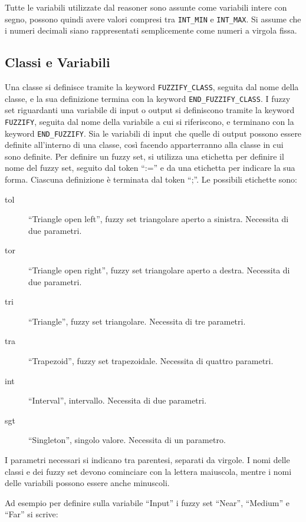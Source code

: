 Tutte le variabili utilizzate dal reasoner sono assunte come variabili intere con segno, possono quindi avere valori compresi tra \verb|INT_MIN| e \verb|INT_MAX|.
Si assume che i numeri decimali siano rappresentati semplicemente come numeri a virgola fissa.


\subsection{Classi e Variabili}
Una classe si definisce tramite la keyword \verb|FUZZIFY_CLASS|, seguita dal nome della classe, e la sua definizione termina con la keyword \verb|END_FUZZIFY_CLASS|.
I fuzzy set riguardanti una variabile di input o output si definiscono tramite la keyword \verb|FUZZIFY|, seguita dal nome della variabile a cui si riferiscono, e terminano con la keyword \verb|END_FUZZIFY|.
Sia le variabili di input che quelle di output possono essere definite all'interno di una classe, così facendo apparterranno alla classe in cui sono definite.
Per definire un fuzzy set, si utilizza una etichetta per definire il nome del fuzzy set, seguito dal token ``:='' e da una etichetta per indicare la sua forma. Ciascuna definizione è terminata dal token ``;''. Le possibili etichette sono:

\begin{description}
 \item [tol] ``Triangle open left'', fuzzy set triangolare aperto a sinistra. Necessita di due parametri.
 \item [tor] ``Triangle open right'', fuzzy set triangolare aperto a destra. Necessita di due parametri.
 \item [tri] ``Triangle'', fuzzy set triangolare. Necessita di tre parametri.
 \item [tra] ``Trapezoid'', fuzzy set trapezoidale. Necessita di quattro parametri.
 \item [int] ``Interval'', intervallo. Necessita di due parametri.
 \item [sgt] ``Singleton'', singolo valore. Necessita di un parametro.
\end{description}

I parametri necessari si indicano tra parentesi, separati da virgole.
I nomi delle classi e dei fuzzy set devono cominciare con la lettera maiuscola, mentre i nomi delle variabili possono essere anche minuscoli.


Ad esempio per definire sulla variabile ``Input'' i fuzzy set ``Near'', ``Medium'' e ``Far'' si scrive:

